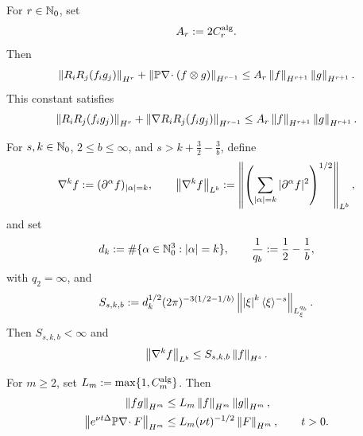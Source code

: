 \begin{lemma}
\label{u:lem:qc-analytic-constants}
For \(r\in\mathbb N_0\), set
\[
 A_r:=2C_r^{\rm alg}.
\]
Then
\begin{equation}
 \left\lVert R_iR_j(f_i g_j)\right\rVert_{H^r}
 +\left\lVert \mathbb P\nabla\!\cdot(f\otimes g)\right\rVert_{H^{r-1}}
 \le A_r\left\lVert f\right\rVert_{H^{r+1}}\left\lVert g\right\rVert_{H^{r+1}}.
 \label{u:eq:qc-product-constant}
\end{equation}
This constant satisfies
\begin{equation}
 \left\lVert R_iR_j(f_i g_j)\right\rVert_{H^r}
 +\left\lVert \nabla R_iR_j(f_i g_j)\right\rVert_{H^{r-1}}
 \le A_r\left\lVert f\right\rVert_{H^{r+1}}\left\lVert g\right\rVert_{H^{r+1}}.
 \label{u:eq:qc-pressure-product-constant}
\end{equation}
\begin{samepage}
For \(s,k\in\mathbb N_0\), \(2\le b\le\infty\), and
\(s>k+\frac32-\frac3b\), define
\[
 \nabla^k f:=(\partial^\alpha f)_{|\alpha|=k},
 \qquad
 \left\lVert \nabla^k f\right\rVert_{L^b}
 :=\left\|\left(
   \sum_{|\alpha|=k}|\partial^\alpha f|^2
 \right)^{1/2}\right\|_{L^b},
\]
and set
\[
 d_k:=\#\{\alpha\in\mathbb N_0^3:\left|\alpha\right|=k\},
 \qquad
 \frac1{q_b}:=\frac12-\frac1b,
\]
with \(q_2=\infty\), and
\begin{equation}
 S_{s,k,b}:=
 d_k^{1/2}(2\pi)^{-3(1/2-1/b)}
 \left\lVert \left|\xi\right|^k\langle\xi\rangle^{-s}\right\rVert_{L^{q_b}_\xi}.
 \label{u:eq:qc-embedding-constant-definition}
\end{equation}
Then \(S_{s,k,b}<\infty\) and
\begin{equation}
 \left\lVert \nabla^k f\right\rVert_{L^b}\le S_{s,k,b}\left\lVert f\right\rVert_{H^s}.
 \label{u:eq:qc-embedding-constant}
\end{equation}
\par
\end{samepage}
For \(m\ge2\), set \(L_m:=\max\{1,C_m^{\rm alg}\}\).  Then
\begin{align}
 \left\lVert fg\right\rVert_{H^m}
 &\le L_m\left\lVert f\right\rVert_{H^m}\left\lVert g\right\rVert_{H^m},
 \label{u:eq:qc-algebra-constant}\\
 \left\lVert e^{\nu t\Delta}\mathbb P\nabla\!\cdot F\right\rVert_{H^m}
 &\le L_m(\nu t)^{-1/2}\left\lVert F\right\rVert_{H^m},
 \qquad t>0.
 \label{u:eq:qc-heat-constant}
\end{align}
\end{lemma}

